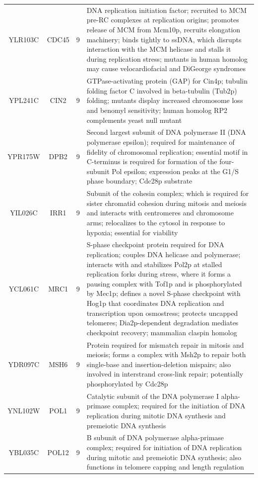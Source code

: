 \documentclass[]{article}
\begin{document}
\begin{longtable}{@{\extracolsep{3pt}} cccp{85mm}}
YLR103C & CDC45 & 9 & DNA replication initiation factor; recruited to MCM pre-RC complexes at replication origins; promotes release of MCM from Mcm10p, recruits elongation machinery; binds tightly to ssDNA, which disrupts interaction with the MCM helicase and stalls it during replication stress; mutants in human homolog may cause velocardiofacial and DiGeorge syndromes \\ 
YPL241C & CIN2 & 9 & GTPase-activating protein (GAP) for Cin4p; tubulin folding factor C involved in beta-tubulin (Tub2p) folding; mutants display increased chromosome loss and benomyl sensitivity; human homolog RP2 complements yeast null mutant \\ 
YPR175W & DPB2 & 9 & Second largest subunit of DNA polymerase II (DNA polymerase epsilon); required for maintenance of fidelity of chromosomal replication; essential motif in C-terminus is required for formation of the four-subunit Pol epsilon; expression peaks at the G1/S phase boundary; Cdc28p substrate \\ 
YIL026C & IRR1 & 9 & Subunit of the cohesin complex; which is required for sister chromatid cohesion during mitosis and meiosis and interacts with centromeres and chromosome arms; relocalizes to the cytosol in response to hypoxia; essential for viability \\ 
YCL061C & MRC1 & 9 & S-phase checkpoint protein required for DNA replication; couples DNA helicase and polymerase; interacts with and stabilizes Pol2p at stalled replication forks during stress, where it forms a pausing complex with Tof1p and is phosphorylated by Mec1p; defines a novel S-phase checkpoint with Hog1p that coordinates DNA replication and transcription upon osmostress; protects uncapped telomeres; Dia2p-dependent degradation mediates checkpoint recovery; mammalian claspin homolog \\ 
YDR097C & MSH6 & 9 & Protein required for mismatch repair in mitosis and meiosis; forms a complex with Msh2p to repair both single-base and insertion-deletion mispairs; also involved in interstrand cross-link repair; potentially phosphorylated by Cdc28p \\ 
YNL102W & POL1 & 9 & Catalytic subunit of the DNA polymerase I alpha-primase complex; required for the initiation of DNA replication during mitotic DNA synthesis and premeiotic DNA synthesis \\ 
YBL035C & POL12 & 9 & B subunit of DNA polymerase alpha-primase complex; required for initiation of DNA replication during mitotic and premeiotic DNA synthesis; also functions in telomere capping and length regulation \\ 

\end{longtable}
\end{document}
